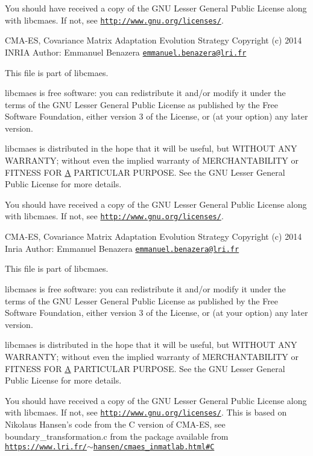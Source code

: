 You should have received a copy of the G\-N\-U Lesser General Public License along with libcmaes. If not, see \href{http://www.gnu.org/licenses/}{\tt http\-://www.\-gnu.\-org/licenses/}.

C\-M\-A-\/\-E\-S, Covariance Matrix Adaptation Evolution Strategy Copyright (c) 2014 I\-N\-R\-I\-A Author\-: Emmanuel Benazera \href{mailto:emmanuel.benazera@lri.fr}{\tt emmanuel.\-benazera@lri.\-fr}

This file is part of libcmaes.

libcmaes is free software\-: you can redistribute it and/or modify it under the terms of the G\-N\-U Lesser General Public License as published by the Free Software Foundation, either version 3 of the License, or (at your option) any later version.

libcmaes is distributed in the hope that it will be useful, but W\-I\-T\-H\-O\-U\-T A\-N\-Y W\-A\-R\-R\-A\-N\-T\-Y; without even the implied warranty of M\-E\-R\-C\-H\-A\-N\-T\-A\-B\-I\-L\-I\-T\-Y or F\-I\-T\-N\-E\-S\-S F\-O\-R \hyperlink{classA}{A} P\-A\-R\-T\-I\-C\-U\-L\-A\-R P\-U\-R\-P\-O\-S\-E. See the G\-N\-U Lesser General Public License for more details.

You should have received a copy of the G\-N\-U Lesser General Public License along with libcmaes. If not, see \href{http://www.gnu.org/licenses/}{\tt http\-://www.\-gnu.\-org/licenses/}.

C\-M\-A-\/\-E\-S, Covariance Matrix Adaptation Evolution Strategy Copyright (c) 2014 Inria Author\-: Emmanuel Benazera \href{mailto:emmanuel.benazera@lri.fr}{\tt emmanuel.\-benazera@lri.\-fr}

This file is part of libcmaes.

libcmaes is free software\-: you can redistribute it and/or modify it under the terms of the G\-N\-U Lesser General Public License as published by the Free Software Foundation, either version 3 of the License, or (at your option) any later version.

libcmaes is distributed in the hope that it will be useful, but W\-I\-T\-H\-O\-U\-T A\-N\-Y W\-A\-R\-R\-A\-N\-T\-Y; without even the implied warranty of M\-E\-R\-C\-H\-A\-N\-T\-A\-B\-I\-L\-I\-T\-Y or F\-I\-T\-N\-E\-S\-S F\-O\-R \hyperlink{classA}{A} P\-A\-R\-T\-I\-C\-U\-L\-A\-R P\-U\-R\-P\-O\-S\-E. See the G\-N\-U Lesser General Public License for more details.

You should have received a copy of the G\-N\-U Lesser General Public License along with libcmaes. If not, see \href{http://www.gnu.org/licenses/}{\tt http\-://www.\-gnu.\-org/licenses/}. This is based on Nikolaus Hansen's code from the C version of C\-M\-A-\/\-E\-S, see boundary\-\_\-transformation.\-c from the package available from \href{https://www.lri.fr/~hansen/cmaes_inmatlab.html#C}{\tt https\-://www.\-lri.\-fr/$\sim$hansen/cmaes\-\_\-inmatlab.\-html\#\-C}

